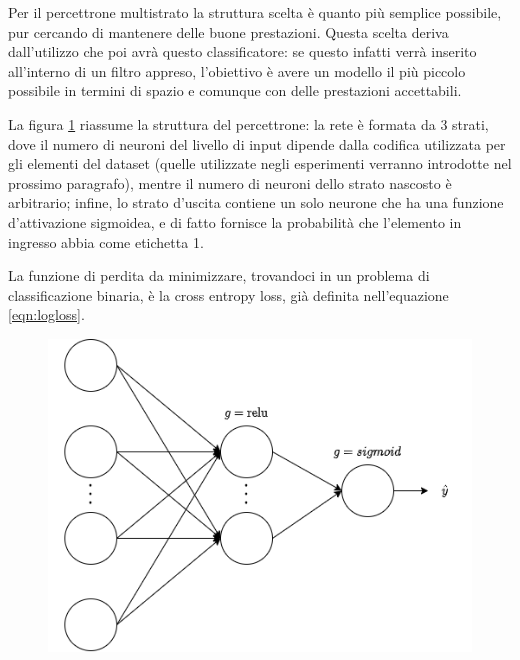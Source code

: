 \documentclass[../../main.tex]{subfiles}
\begin{document}
    Per il percettrone multistrato la struttura scelta è quanto più semplice possibile, pur cercando di mantenere delle buone prestazioni. Questa scelta deriva dall'utilizzo che poi avrà questo classificatore: se questo infatti verrà inserito all'interno di un filtro appreso, l'obiettivo è avere un modello il più piccolo possibile in termini di spazio e comunque con delle prestazioni accettabili.

    La figura \ref{fig:strutturaPercettrone} riassume la struttura del percettrone: la rete è formata da 3 strati, dove il numero di neuroni del livello di input dipende dalla codifica utilizzata per gli elementi del dataset (quelle utilizzate negli esperimenti verranno introdotte nel prossimo paragrafo), mentre il numero di neuroni dello strato nascosto è arbitrario; infine, lo strato d'uscita contiene un solo neurone che ha una funzione d'attivazione sigmoidea, e di fatto fornisce la probabilità che l'elemento in ingresso abbia come etichetta 1.

    La funzione di perdita da minimizzare, trovandoci in un problema di classificazione binaria, è la cross entropy loss, già definita nell'equazione \ref{eqn:logloss}.

    \begin{figure}[H]
        \centering
        \includegraphics[width=\textwidth]{immagini/6_4/percettroneStruttura.drawio.png}
        \caption{}
        \label{fig:strutturaPercettrone}
    \end{figure}
\end{document}
